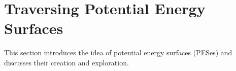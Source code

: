 \section{Traversing Potential Energy Surfaces}
\label{sec:pes}

This section introduces the idea of potential energy surfaces (PESes) and discusses their creation and exploration.

\incomplete



%





